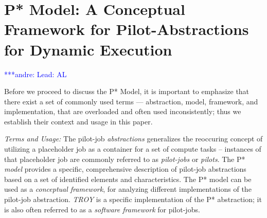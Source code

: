 \documentclass[conference,final]{IEEEtran}
\newcommand{\alnote}[1]{ {\textcolor{blue} { ***andre: #1 }}}
\newcommand{\alnote}[1]{}
\newcommand{\upp}{\vspace*{-0.5em}}
\begin{document}
\section{P* Model: A Conceptual Framework for Pilot-Abstractions for
  Dynamic Execution \upp\upp}
\alnote{Lead: AL}
\label{sec:pilot-model}





Before we proceed to discuss the P* Model, it is important to
emphasize that there exist a set of commonly used terms ---
abstraction, model, framework, and implementation, that are overloaded
and often used inconsistently; thus we establish their context and
usage in this paper.

\emph{Terms and Usage:} The pilot-job \emph{ abstractions} generalizes
the reoccuring concept of utilizing a placeholder job as a container
for a set of compute tasks -- instances of that placeholder job are
commonly referred to as \emph{pilot-jobs} or \emph{pilots}.  The P*
\emph{model} provides a specific, comprehensive description of
pilot-job abstractions based on a set of identified elements and
characteristics.  The P* model can be used as a {\it conceptual
  framework}, for analyzing different implementations of the pilot-job
abstraction. \emph{TROY} is a specific implementation of the P*
abstraction; it is also often referred to as a {\it software
  framework} for pilot-jobs.
\end{document}
